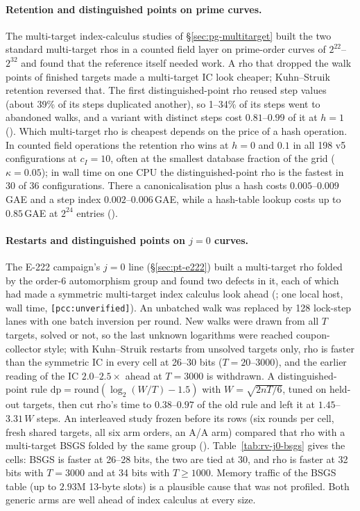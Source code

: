 \paragraph{Retention and distinguished points on prime curves.} The
multi-target index-calculus studies of \S\ref{sec:pg-multitarget} built the
two standard multi-target rhos in a counted field layer on prime-order
curves of $2^{22}$--$2^{32}$ and found that the reference itself needed
work. A rho that dropped the walk points of finished targets made a
multi-target IC look cheaper; Kuhn--Struik retention reversed that. The
first distinguished-point rho reused step values (about 39\% of its steps
duplicated another), so 1--34\% of its steps went to abandoned walks, and a
variant with distinct steps cost $0.81$--$0.99$ of it at $h=1$
(). Which multi-target rho
is cheapest depends on the price of a hash operation. In counted field
operations the retention rho wins at $h=0$ and $0.1$ in all 198 v5
configurations at $c_I=10$, often at the smallest database fraction of the
grid ($\kappa=0.05$); in wall time on one CPU the distinguished-point rho is
the fastest in 30 of 36 configurations. There a canonicalisation plus a
hash costs $0.005$--$0.009$\,GAE and a step index $0.002$--$0.006$\,GAE,
while a hash-table lookup costs up to $0.85$\,GAE at $2^{24}$ entries
().

\paragraph{Restarts and distinguished points on $j=0$ curves.} The E-222
campaign's $j=0$ line (\S\ref{sec:pt-e222}) built a multi-target rho folded
by the order-6 automorphism group and found two defects in it, each of which
had made a symmetric multi-target index calculus look ahead
(; one
local host, wall time, \texttt{[pcc:unverified]}). An unbatched walk was
replaced by 128 lock-step lanes with one batch inversion per round. New
walks were drawn from all $T$ targets, solved or not, so the last unknown
logarithms were reached coupon-collector style; with Kuhn--Struik restarts
from unsolved targets only, rho is faster than the symmetric IC in every
cell at 26--30 bits ($T=20$--3000), and the earlier reading of the IC
$2.0$--$2.5\times$ ahead at $T=3000$ is withdrawn. A distinguished-point
rule $\mathrm{dp}=\mathrm{round}(\log_2(W/T)-1.5)$ with
$W=\sqrt{2nT/6}$, tuned on held-out targets, then cut rho's time to
$0.38$--$0.97$ of the old rule and left it at $1.45$--$3.31\,W$ steps. An
interleaved study frozen before its rows (six rounds per cell, fresh shared
targets, all six arm orders, an A/A arm) compared that rho with a
multi-target BSGS folded by the same group
().
Table~\ref{tab:rv-j0-bsgs} gives the cells: BSGS is faster at 26--28 bits,
the two are tied at 30, and rho is faster at 32 bits with $T=3000$ and at 34
bits with $T\ge1000$. Memory traffic of the BSGS table (up to $2.93$M
13-byte slots) is a plausible cause that was not profiled. Both generic arms
are well ahead of index calculus at every size.

